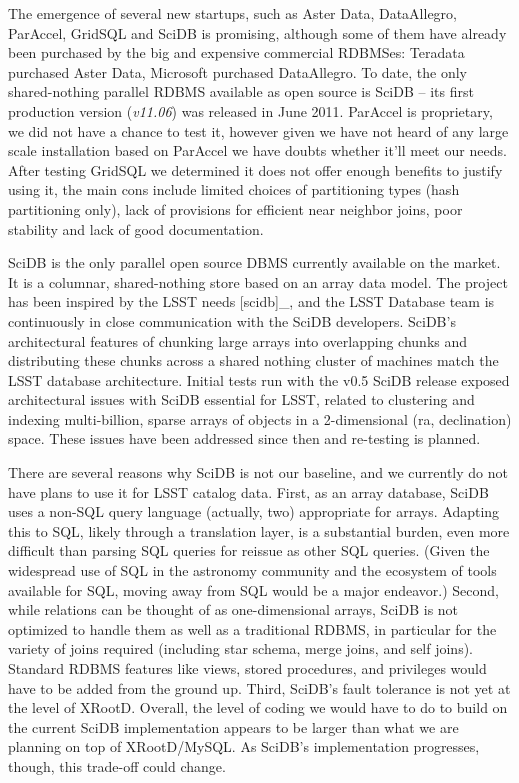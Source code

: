 \documentclass[DM,lsstdraft,toc]{lsstdoc}
\begin{document}
The emergence of several new startups, such as Aster Data, DataAllegro,
ParAccel, GridSQL and SciDB is promising, although some of them have
already been purchased by the big and expensive commercial RDBMSes:
Teradata purchased Aster Data, Microsoft purchased DataAllegro. To date,
the only shared-nothing parallel RDBMS available as open source is SciDB
-- its first production version (\emph{v11.06}) was released in June
2011. ParAccel is proprietary, we did not have a chance to test it,
however given we have not heard of any large scale installation based on
ParAccel we have doubts whether it'll meet our needs. After testing
GridSQL we determined it does not offer enough benefits to justify using
it, the main cons include limited choices of partitioning types (hash
partitioning only), lack of provisions for efficient near neighbor
joins, poor stability and lack of good documentation.

SciDB is the only parallel open source DBMS currently available on the
market. It is a columnar, shared-nothing store based on an array data
model. The project has been inspired by the LSST needs {[}scidb{]}\_,
and the LSST Database team is continuously in close communication with
the SciDB developers. SciDB's architectural features of chunking large
arrays into overlapping chunks and distributing these chunks across a
shared nothing cluster of machines match the LSST database architecture.
Initial tests run with the v0.5 SciDB release exposed architectural
issues with SciDB essential for LSST, related to clustering and indexing
multi-billion, sparse arrays of objects in a 2-dimensional (ra,
declination) space. These issues have been addressed since then and
re-testing is planned.

There are several reasons why SciDB is not our baseline, and we
currently do not have plans to use it for LSST catalog data. First, as
an array database, SciDB uses a non-SQL query language (actually, two)
appropriate for arrays. Adapting this to SQL, likely through a
translation layer, is a substantial burden, even more difficult than
parsing SQL queries for reissue as other SQL queries. (Given the
widespread use of SQL in the astronomy community and the ecosystem of
tools available for SQL, moving away from SQL would be a major
endeavor.) Second, while relations can be thought of as one-dimensional
arrays, SciDB is not optimized to handle them as well as a traditional
RDBMS, in particular for the variety of joins required (including star
schema, merge joins, and self joins). Standard RDBMS features like
views, stored procedures, and privileges would have to be added from the
ground up. Third, SciDB's fault tolerance is not yet at the level of
XRootD. Overall, the level of coding we would
have to do to build on the current SciDB implementation appears to be
larger than what we are planning on top of
XRootD/MySQL. As SciDB's implementation
progresses, though, this trade-off could change.
\end{document}
